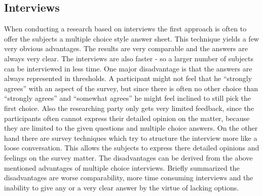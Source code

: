 \documentclass{sigchi}
\begin{document}
\subsection{Interviews}
When conducting a research based on interviews the first approach is often to offer the subjects a multiple choice style answer sheet. This technique yields a few very obvious advantages. The results are very comparable and the answers are always very clear. The interviews are also faster - so a larger number of subjects can be interviewed in less time. One major disadvantage is that the answers are always represented in thresholds. A participant might not feel that he ``strongly agrees'' with an aspect of the survey, but since there is often no other choice than ``strongly agrees'' and ``somewhat agrees'' he might feel inclined to still pick the first choice. Also the researching party only gets very limited feedback, since the participants often cannot express their detailed opinion on the matter, because they are limited to the given questions and multiple choice answers. On the other hand there are survey techniques which try to structure the interview more like a loose conversation. This allows the subjects to express there detailed opinions and feelings on the survey matter. The disadvantages can be derived from the above mentioned advantages of multiple choice interviews. Briefly summarized the disadvantages are worse comparability, more time consuming interviews and the inability to give any or a very clear answer by the virtue of lacking options.
\end{document}
